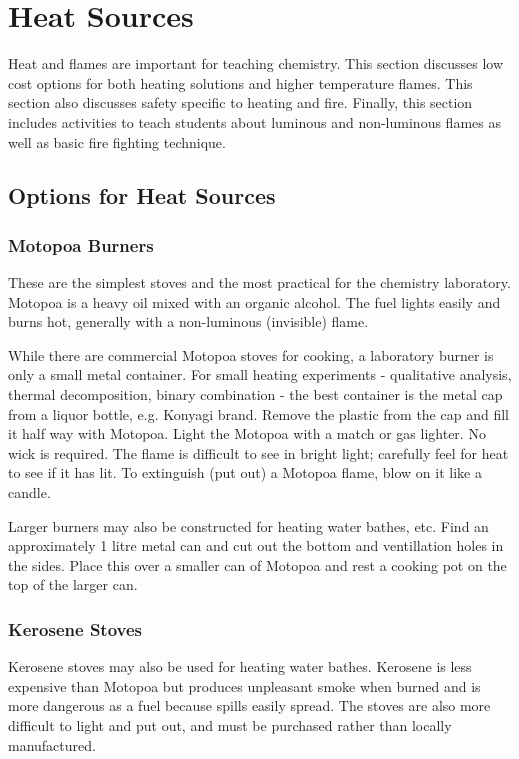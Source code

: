 \section{Heat Sources}

Heat and flames are important for teaching chemistry. This section discusses low cost options for both heating solutions and higher temperature flames. This section also discusses safety specific to heating and fire. Finally, this section includes activities to teach students about luminous and non-luminous flames as well as basic fire fighting technique.

\subsection{Options for Heat Sources}

\subsubsection{Motopoa Burners}

These are the simplest stoves and the most practical for the chemistry laboratory. Motopoa is a heavy oil mixed with an organic alcohol. The fuel lights easily and burns hot, generally with a non-luminous (invisible) flame.

While there are commercial Motopoa stoves for cooking, a laboratory burner is only a small metal container. For small heating experiments - qualitative analysis, thermal decomposition, binary combination - the best container is the metal cap from a liquor bottle, e.g. Konyagi brand. Remove the plastic from the cap and fill it half way with Motopoa. Light the Motopoa with a match or gas lighter. No wick is required. The flame is difficult to see in bright light; carefully feel for heat to see if it has lit. To extinguish (put out) a Motopoa flame, blow on it like a candle.

Larger burners may also be constructed for heating water bathes, etc. Find an approximately 1 litre metal can and cut out the bottom and ventillation holes in the sides. Place this over a smaller can of Motopoa and rest a cooking pot on the top of the larger can.

\subsubsection{Kerosene Stoves}

Kerosene stoves may also be used for heating water bathes. Kerosene is less expensive than Motopoa but produces unpleasant smoke when burned and is more dangerous as a fuel because spills easily spread. The stoves are also more difficult to light and put out, and must be purchased rather than locally manufactured.

